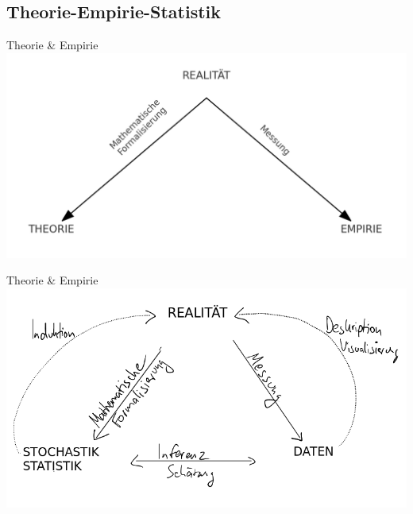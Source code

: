 \documentclass[
  10pt,
  ignorenonframetext,
]{beamer}
\begin{document}
\subsection{Theorie-Empirie-Statistik}\label{theorie-empirie-statistik}

\begin{frame}{Theorie \& Empirie}
\label{theorie-empirie}
\includegraphics{pics/reality-math-data-1.png}
\end{frame}

\begin{frame}{Theorie \& Empirie}
\label{theorie-empirie-1}
\includegraphics{pics/reality-math-data-2.png}
\end{frame}
\end{document}

